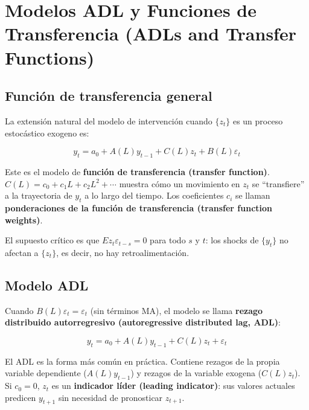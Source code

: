 \documentclass[12pt]{article}
\begin{document}
\section{Modelos ADL y Funciones de Transferencia (ADLs and Transfer Functions)}

\subsection{Funci\'on de transferencia general}

La extensi\'on natural del modelo de intervenci\'on cuando $\{z_t\}$ es un proceso estoc\'astico exogeno es:

\begin{equation}
y_t = a_0 + A(L)y_{t-1} + C(L)z_t + B(L)\varepsilon_t
\end{equation}

\begin{intuicionmat}
Este es el modelo de \textbf{funci\'on de transferencia (transfer function)}. $C(L) = c_0 + c_1 L + c_2 L^2 + \cdots$ muestra c\'omo un movimiento en $z_t$ se ``transfiere'' a la trayectoria de $y_t$ a lo largo del tiempo. Los coeficientes $c_i$ se llaman \textbf{ponderaciones de la funci\'on de transferencia (transfer function weights)}.
\end{intuicionmat}

El supuesto cr\'itico es que $E z_t \varepsilon_{t-s} = 0$ para todo $s$ y $t$: los shocks de $\{y_t\}$ no afectan a $\{z_t\}$, es decir, no hay retroalimentaci\'on.

\subsection{Modelo ADL}

Cuando $B(L)\varepsilon_t = \varepsilon_t$ (sin t\'erminos MA), el modelo se llama \textbf{rezago distribuido autorregresivo (autoregressive distributed lag, ADL)}:

\begin{equation}
y_t = a_0 + A(L)y_{t-1} + C(L)z_t + \varepsilon_t
\end{equation}

\begin{intuicionmat}
El ADL es la forma m\'as com\'un en pr\'actica. Contiene rezagos de la propia variable dependiente ($A(L)y_{t-1}$) y rezagos de la variable exogena ($C(L)z_t$). Si $c_0 = 0$, $z_t$ es un \textbf{indicador l\'ider (leading indicator)}: sus valores actuales predicen $y_{t+1}$ sin necesidad de pronosticar $z_{t+1}$.
\end{intuicionmat}
\end{document}
